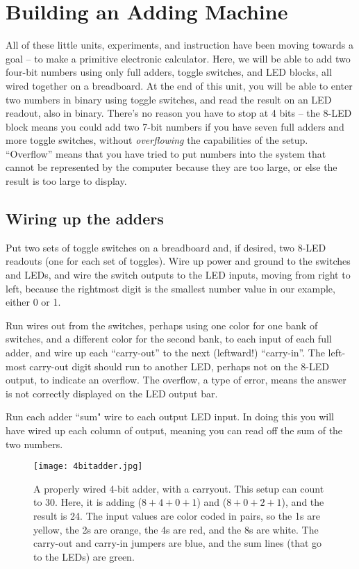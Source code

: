 \section{Building an Adding Machine}
All of these little units, experiments, and instruction have been moving towards a goal -- to make a primitive electronic calculator. Here, we will be able to add two four-bit numbers using only full adders, toggle switches, and LED blocks, all wired together on a breadboard. At the end of this unit, you will be able to enter two numbers in binary using toggle switches, and read the result on an LED readout, also in binary. There's no reason you have to stop at 4 bits -- the 8-LED block means you could add two 7-bit numbers if you have seven full adders and more toggle switches, without \emph{overflowing} the capabilities of the setup. ``Overflow'' means that you have tried to put numbers into the system that cannot be represented by the computer because they are too large, or else the result is too large to display. 

\subsection*{Wiring up the adders}

Put two sets of toggle switches on a breadboard and, if desired, two 8-LED readouts (one for each set of toggles). Wire up power and ground to the switches and LEDs, and wire the switch outputs to the LED inputs, moving from right to left, because the rightmost digit is the smallest number value in our example, either 0 or 1.

Run wires out from the switches, perhaps using one color for one bank of switches, and a different color for the second bank, to each input of each full adder, and wire up each ``carry-out'' to the next (leftward!) ``carry-in''. The left-most carry-out digit should run to another LED, perhaps not on the 8-LED output, to indicate an overflow. The overflow, a type of error, means the answer is not correctly displayed on the LED output bar.

Run each adder ``sum" wire to each output LED input. In doing this you will have wired up each column of output, meaning you can read off the sum of the two numbers.


\begin{figure}
\texttt{[image: 4bitadder.jpg]}
\caption{A properly wired 4-bit adder, with a carryout. This setup can count to 30. Here, it is adding ($8 + 4 + 0 + 1$) and ($8 + 0 + 2 + 1$), and the result is 24. The input values are color coded in pairs, so the 1s are yellow, the 2s are orange, the 4s are red, and the 8s are white. The carry-out and carry-in jumpers are blue, and the sum lines (that go to the LEDs) are green.}

\end{figure}

